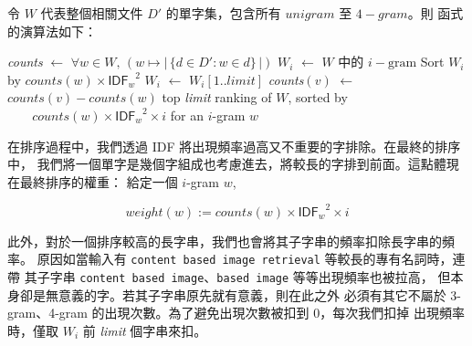 令 $W$ 代表整個相關文件 $D'$ 的單字集，包含所有 $unigram$ 至 $4-gram$。則
 函式的演算法如下：

\begin{algorithmic}
    \State \textit{counts} $\gets$ $\forall w\in W,\,\left(w\mapsto|\,\{d\in D':w\in d\}\,|\right)$
      \State $W_i$ $\gets$ $W$ 中的 $i-\text{gram}$
      \State Sort $W_i$ by $\mathit{counts}(w)\times {\mathsf{IDF}_w}^2$
      \State $W_i$ $\gets$ $W_i[1..\mathit{limit}]$
          \State \textit{counts}$(v)$ $\gets$ $\mathit{counts}(v)-\mathit{counts}(w)$
        \EndFor
      \EndFor
    \EndFor
    \State\Return top \textit{limit} ranking of $W$, sorted by
    \State   $\;\;\;\;\;\;\;\mathit{counts}(w)\times{\mathsf{IDF}_w}^2\times i$ for an $i$-gram $w$
  \EndFunction
\end{algorithmic}

在排序過程中，我們透過 \textsf{IDF} 將出現頻率過高又不重要的字排除。在最終的排序中，
我們將一個單字是幾個字組成也考慮進去，將較長的字排到前面。這點體現在最終排序的權重：
給定一個 $i$-gram $w$,

\[ \mathit{weight}(w) := \mathit{counts}(w)\times{\mathsf{IDF}_w}^2\times i \]

此外，對於一個排序較高的長字串，我們也會將其子字串的頻率扣除長字串的頻率。
原因如當輸入有 \texttt{content based image retrieval} 等較長的專有名詞時，連帶
其子字串 \texttt{content based image}、\texttt{based image} 等等出現頻率也被拉高，
但本身卻是無意義的字。若其子字串原先就有意義，則在此之外
必須有其它不屬於 3-gram、4-gram 的出現次數。為了避免出現次數被扣到 0，每次我們扣掉
出現頻率時，僅取 $W_i$ 前 \textit{limit} 個字串來扣。
